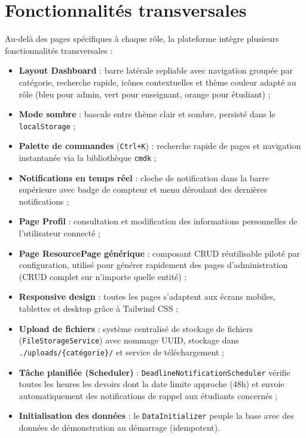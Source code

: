 \section*{Fonctionnalités transversales}

Au-delà des pages spécifiques à chaque rôle, la plateforme intègre plusieurs fonctionnalités transversales :

\begin{itemize}
    \item \textbf{Layout Dashboard} : barre latérale repliable avec navigation groupée par catégorie, recherche rapide, icônes contextuelles et thème couleur adapté au rôle (bleu pour admin, vert pour enseignant, orange pour étudiant) ;
    
    \item \textbf{Mode sombre} : bascule entre thème clair et sombre, persisté dans le \texttt{localStorage} ;
    
    \item \textbf{Palette de commandes} (\texttt{Ctrl+K}) : recherche rapide de pages et navigation instantanée via la bibliothèque \texttt{cmdk} ;
    
    \item \textbf{Notifications en temps réel} : cloche de notification dans la barre supérieure avec badge de compteur et menu déroulant des dernières notifications ;
    
    \item \textbf{Page Profil} : consultation et modification des informations personnelles de l'utilisateur connecté ;
    
    \item \textbf{Page ResourcePage générique} : composant CRUD réutilisable piloté par configuration, utilisé pour générer rapidement des pages d'administration (CRUD complet sur n'importe quelle entité) ;
    
    \item \textbf{Responsive design} : toutes les pages s'adaptent aux écrans mobiles, tablettes et desktop grâce à Tailwind CSS ;
    
    \item \textbf{Upload de fichiers} : système centralisé de stockage de fichiers (\texttt{FileStorageService}) avec nommage UUID, stockage dans \texttt{./uploads/\{catégorie\}/} et service de téléchargement ;
    
    \item \textbf{Tâche planifiée (Scheduler)} : \texttt{DeadlineNotificationScheduler} vérifie toutes les heures les devoirs dont la date limite approche (48h) et envoie automatiquement des notifications de rappel aux étudiants concernés ;
    
    \item \textbf{Initialisation des données} : le \texttt{DataInitializer} peuple la base avec des données de démonstration au démarrage (idempotent).
\end{itemize}

